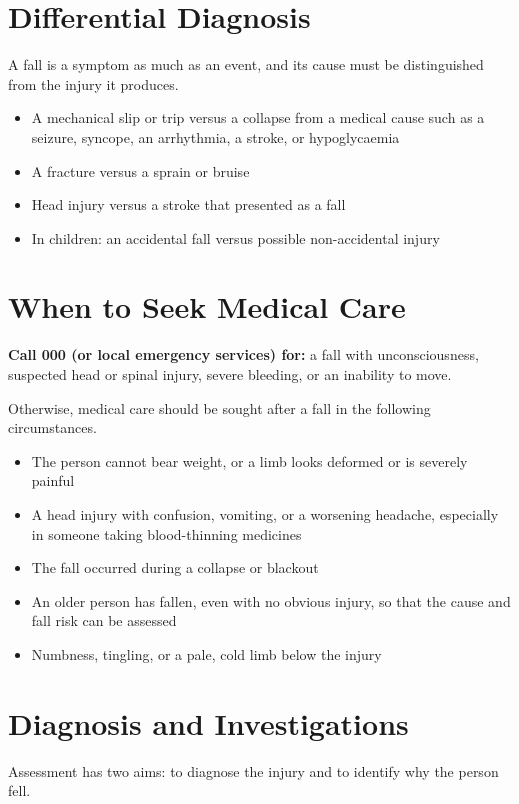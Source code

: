 \section*{Differential Diagnosis}
A fall is a symptom as much as an event, and its cause must be distinguished from the injury it produces.

\begin{itemize}
    \item A mechanical slip or trip versus a collapse from a medical cause such as a seizure, syncope, an arrhythmia, a stroke, or hypoglycaemia
    \item A fracture versus a sprain or bruise
    \item Head injury versus a stroke that presented as a fall
    \item In children: an accidental fall versus possible non-accidental injury
\end{itemize}

\section*{When to Seek Medical Care}
\textbf{Call 000 (or local emergency services) for:} a fall with unconsciousness, suspected head or spinal injury, severe bleeding, or an inability to move.

Otherwise, medical care should be sought after a fall in the following circumstances.

\begin{itemize}
    \item The person cannot bear weight, or a limb looks deformed or is severely painful
    \item A head injury with confusion, vomiting, or a worsening headache, especially in someone taking blood-thinning medicines
    \item The fall occurred during a collapse or blackout
    \item An older person has fallen, even with no obvious injury, so that the cause and fall risk can be assessed
    \item Numbness, tingling, or a pale, cold limb below the injury
\end{itemize}

\section*{Diagnosis and Investigations}
Assessment has two aims: to diagnose the injury and to identify why the person fell.

